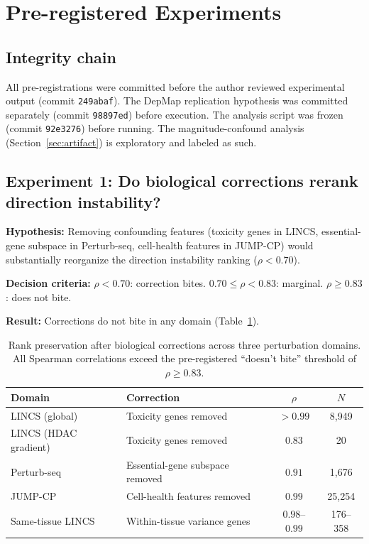 \documentclass[11pt]{article}
\begin{document}
\section{Pre-registered Experiments}

\subsection{Integrity chain}

All pre-registrations were committed before the author reviewed
experimental output (commit \texttt{249abaf}). The DepMap replication
hypothesis was committed separately (commit \texttt{98897ed}) before
execution. The analysis script was frozen (commit \texttt{92e3276})
before running. The magnitude-confound analysis (Section~\ref{sec:artifact})
is exploratory and labeled as such.

\subsection{Experiment 1: Do biological corrections rerank direction instability?}

\textbf{Hypothesis:} Removing confounding features (toxicity genes in
LINCS, essential-gene subspace in Perturb-seq, cell-health features in
JUMP-CP) would substantially reorganize the direction instability ranking
($\rho < 0.70$).

\textbf{Decision criteria:} $\rho < 0.70$: correction bites.
$0.70 \leq \rho < 0.83$: marginal. $\rho \geq 0.83$: does not bite.

\textbf{Result:} Corrections do not bite in any domain (Table~\ref{tab:robustness}).

\begin{table}[h]
\centering
\caption{Rank preservation after biological corrections across three
perturbation domains. All Spearman correlations exceed the pre-registered
``doesn't bite'' threshold of $\rho \geq 0.83$.}
\label{tab:robustness}
\begin{tabular}{llcc}
\toprule
Domain & Correction & $\rho$ & $N$ \\
\midrule
LINCS (global) & Toxicity genes removed & $>0.99$ & 8{,}949 \\
LINCS (HDAC gradient) & Toxicity genes removed & $0.83$ & 20 \\
Perturb-seq & Essential-gene subspace removed & $0.91$ & 1{,}676 \\
JUMP-CP & Cell-health features removed & $0.99$ & 25{,}254 \\
\midrule
Same-tissue LINCS & Within-tissue variance genes & $0.98$--$0.99$ & 176--358 \\
\bottomrule
\end{tabular}
\end{table}
\end{document}
